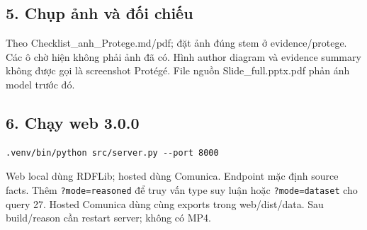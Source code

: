 \documentclass[
  11pt,
]{article}
\begin{document}
\subsection{5. Chụp ảnh và đối
chiếu}\label{chux1ee5p-ux1ea3nh-vuxe0-ux111ux1ed1i-chiux1ebfu}

Theo
Checklis\allowbreak{}t\_\allowbreak{}anh\_\allowbreak{}\allowbreak{}Pr\allowbreak{}otege.\allowbreak{}md\allowbreak{}/\allowbreak{}pdf;
đặt ảnh đúng stem ở
evidence\allowbreak{}/\allowbreak{}protege\allowbreak{}.\allowbreak{}
Các ô chờ hiện không phải ảnh đã có. Hình author diagram và evidence
summary không được gọi là screenshot Protégé. File nguồn
Slide\_\allowbreak{}fu\allowbreak{}ll.\allowbreak{}pptx.\allowbreak{}pdf
phản ánh model trước đó.

\subsection{6. Chạy web 3.0.0}\label{chux1ea1y-web-3.0.0}

\begin{verbatim}
.venv/bin/python src/server.py --port 8000
\end{verbatim}

Web local dùng RDFLib; hosted dùng Comunica. Endpoint mặc định source
facts. Thêm \texttt{?mode=re\allowbreak{}asoned} để truy vấn type suy
luận hoặc \texttt{?mode=da\allowbreak{}taset} cho query 27. Hosted
Comunica dùng cùng exports trong
web/\allowbreak{}dist\allowbreak{}/\allowbreak{}data.\allowbreak{} Sau
build/reason cần restart server; không có MP4.
\end{document}
